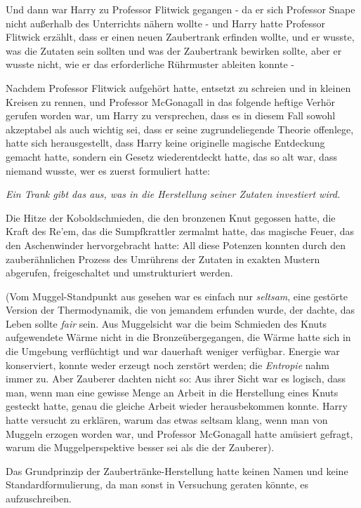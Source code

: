 {Und dann war Harry zu Professor Flitwick gegangen - da er sich Professor Snape nicht außerhalb des Unterrichts nähern wollte - und Harry hatte Professor Flitwick erzählt, dass er einen neuen Zaubertrank erfinden wollte, und er wusste, was die Zutaten sein sollten und was der Zaubertrank bewirken sollte, aber er wusste nicht, wie er das erforderliche Rührmuster ableiten konnte -

Nachdem Professor Flitwick aufgehört hatte, entsetzt zu schreien und in kleinen Kreisen zu rennen, und Professor McGonagall in das folgende heftige Verhör gerufen worden war, um Harry zu versprechen, dass es in diesem Fall sowohl akzeptabel als auch wichtig sei, dass er seine zugrundeliegende Theorie offenlege, hatte sich herausgestellt, dass Harry keine originelle magische Entdeckung gemacht hatte, sondern ein Gesetz wiederentdeckt hatte, das so alt war, dass niemand wusste, wer es zuerst formuliert hatte:

\emph{Ein Trank gibt das aus, was in die Herstellung seiner Zutaten investiert wird.}

Die Hitze der Koboldschmieden, die den bronzenen Knut gegossen hatte, die Kraft des Re'em, das die Sumpfkrattler zermalmt hatte, das magische Feuer, das den Aschenwinder hervorgebracht hatte: All diese Potenzen konnten durch den zauberähnlichen Prozess des Umrührens der Zutaten in exakten Mustern abgerufen, freigeschaltet und umstrukturiert werden.

(Vom Muggel-Standpunkt aus gesehen war es einfach nur \emph{seltsam}, eine gestörte Version der Thermodynamik, die von jemandem erfunden wurde, der dachte, das Leben sollte \emph{fair} sein. Aus Muggelsicht war die beim Schmieden des Knuts aufgewendete Wärme nicht in die Bronzeübergegangen, die Wärme hatte sich in die Umgebung verflüchtigt und war dauerhaft weniger verfügbar. Energie war konserviert, konnte weder erzeugt noch zerstört werden; die \emph{Entropie} nahm immer zu. Aber Zauberer dachten nicht so: Aus ihrer Sicht war es logisch, dass man, wenn man eine gewisse Menge an Arbeit in die Herstellung eines Knuts gesteckt hatte, genau die gleiche Arbeit wieder herausbekommen konnte. Harry hatte versucht zu erklären, warum das etwas seltsam klang, wenn man von Muggeln erzogen worden war, und Professor McGonagall hatte amüsiert gefragt, warum die Muggelperspektive besser sei als die der Zauberer).

Das Grundprinzip der Zaubertränke-Herstellung hatte keinen Namen und keine Standardformulierung, da man sonst in Versuchung geraten könnte, es aufzuschreiben.

}
